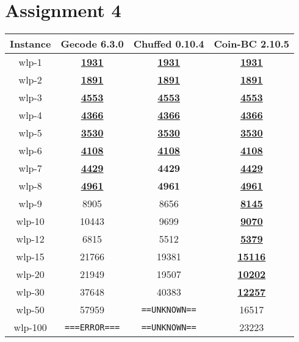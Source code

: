 \documentclass{article}
\newcommand{\UNK}{\texttt{==UNKNOWN==}}
\newcommand{\ERR}{\texttt{===ERROR===}}
\newcommand{\sol}[1]{#1}
\newcommand{\opt}[1]{\textbf{#1}}
\newcommand{\proved}[1]{\textbf{\underline{#1}}}
\begin{document}
\section{Assignment 4}

\begin{table}[H]
    \begin{center}
        \begin{tabular}{|c|c|c|c|}
            \hline
            \textbf{Instance}&\textbf{Gecode 6.3.0}&\textbf{Chuffed 0.10.4}&\textbf{Coin-BC 2.10.5}  \\
            \hline
            wlp-1         &     \proved{1931}   &   \proved{1931}   &   \proved{1931}   \\
            \hline
            wlp-2         &     \proved{1891}   &   \proved{1891}   &   \proved{1891}   \\
            \hline
            wlp-3         &     \proved{4553}   &   \proved{4553}   &   \proved{4553}   \\
            \hline
            wlp-4         &     \proved{4366}   &   \proved{4366}   &   \proved{4366}   \\
            \hline
            wlp-5         &     \proved{3530}   &   \proved{3530}   &   \proved{3530}   \\
            \hline
            wlp-6         &     \proved{4108}   &   \proved{4108}   &   \proved{4108}   \\
            \hline
            wlp-7         &     \proved{4429}   &   \opt{4429}      &   \proved{4429}   \\
            \hline
            wlp-8         &     \proved{4961}   &   \opt{4961}      &   \proved{4961}   \\
            \hline
            wlp-9         &     \sol{8905}      &   \sol{8656}      &   \proved{8145}   \\
            \hline
            wlp-10        &     \sol{10443}     &   \sol{9699}      &   \proved{9070}   \\
            \hline
            wlp-12        &     \sol{6815}      &   \sol{5512}      &   \proved{5379}   \\
            \hline
            wlp-15        &     \sol{21766}     &   \sol{19381}     &   \proved{15116}  \\
            \hline
            wlp-20        &     \sol{21949}     &   \sol{19507}     &   \proved{10202}  \\
            \hline
            wlp-30        &     \sol{37648}     &   \sol{40383}     &   \proved{12257}  \\
            \hline
            wlp-50        &     \sol{57959}     &   \UNK            &   \sol{16517}     \\
            \hline
            wlp-100       &     \ERR            &   \UNK            &   \sol{23223}     \\
            \hline
        \end{tabular}
    \end{center}
\end{table}
\end{document}

